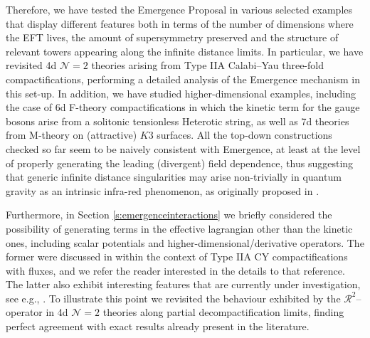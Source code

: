 Therefore, we have tested the Emergence Proposal in various selected examples that display different features both in terms of the number of dimensions where the EFT lives, the amount of supersymmetry preserved and the structure of relevant towers appearing along the infinite distance limits. In particular, we have revisited 4d $\mathcal{N}=2$ theories arising from Type IIA Calabi--Yau three-fold compactifications, performing a detailed analysis of the Emergence mechanism in this set-up. In addition, we have studied higher-dimensional examples, including the case of 6d  F-theory compactifications in which the kinetic term for the gauge bosons arise from a solitonic tensionless Heterotic string, as well as 7d theories from M-theory on (attractive) $K3$ surfaces. All the top-down constructions checked so far seem to be naively consistent with Emergence, at least at the level of properly generating the leading (divergent) field dependence, thus suggesting that generic infinite distance singularities may arise non-trivially in quantum gravity as an intrinsic infra-red phenomenon, as originally proposed in \cite{Palti:2019pca,Harlow:2015lma,Grimm:2018ohb,Corvilain:2018lgw,Heidenreich:2017sim,Heidenreich:2018kpg}.

Furthermore, in Section \ref{s:emergenceinteractions} we briefly considered the possibility of generating terms in the effective lagrangian other than the kinetic ones, including scalar potentials and higher-dimensional/derivative operators. The former were discussed in \cite{Castellano:2022bvr} within the context of Type IIA CY compactifications with fluxes, and we refer the reader interested in the details to that reference. The latter also exhibit interesting features that are currently under investigation, see e.g., \cite{Blumenhagen:2023xmk}. To illustrate this point we revisited the behaviour exhibited by the $\mathcal{R}^2$--\,operator in 4d $\mathcal{N}=2$ theories along partial decompactification limits, finding perfect agreement with exact results already present in the literature. 
 

